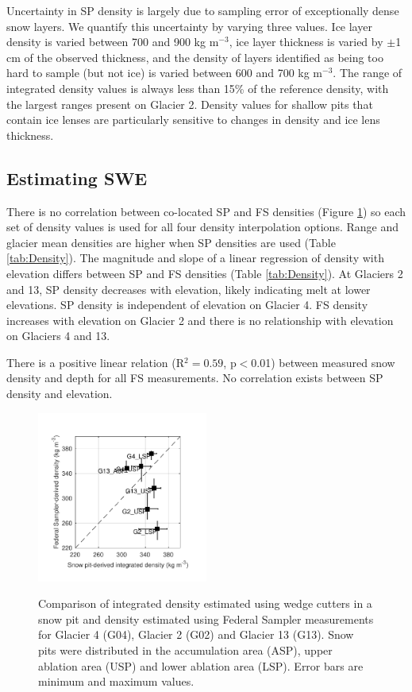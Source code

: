 \documentclass[twocolumn,letterpaper]{igs}
\begin{document}
Uncertainty in SP density is largely due to sampling error of exceptionally dense snow layers. We quantify this uncertainty by varying three values. Ice layer density is varied between 700 and 900 kg m$^{-3}$, ice layer thickness is varied by $\pm$1 cm of the observed thickness, and the density of layers identified as being too hard to sample (but not ice) is varied between 600 and 700 kg m$^{-3}$. The range of integrated density values is always less than 15\% of the reference density, with the largest ranges present on Glacier 2. Density values for shallow pits that contain ice lenses are particularly sensitive to changes in density and ice lens thickness.

\subsection{Estimating SWE}

There is no correlation between co-located SP and FS densities (Figure \ref{fig:density_pitVStube}) so each set of density values is used for all four density interpolation options. Range and glacier mean densities are higher when SP densities are used (Table \ref{tab:Density}). The magnitude and slope of a linear regression of density with elevation differs between SP and FS densities (Table \ref{tab:Density}). At Glaciers 2 and 13, SP density decreases with elevation, likely indicating melt at lower elevations. SP density is independent of elevation on Glacier 4. FS density increases with elevation on Glacier 2 and there is no relationship with elevation on Glaciers 4 and 13. 

There is a positive linear relation (R$^2= 0.59$, p$<$0.01) between measured snow density and depth for all FS measurements. No correlation exists between SP density and elevation.


\begin{figure}
	\centering
	\includegraphics[width =0.5\textwidth]{SPvsFS.pdf}\\
	\caption{Comparison of integrated density estimated using wedge cutters in a snow pit and density estimated using Federal Sampler measurements for Glacier 4 (G04), Glacier 2 (G02) and Glacier 13 (G13). Snow pits were distributed in the accumulation area (ASP), upper ablation area (USP) and lower ablation area (LSP). Error bars are minimum and maximum values.}
	\label{fig:density_pitVStube}
\end{figure}
\end{document}
